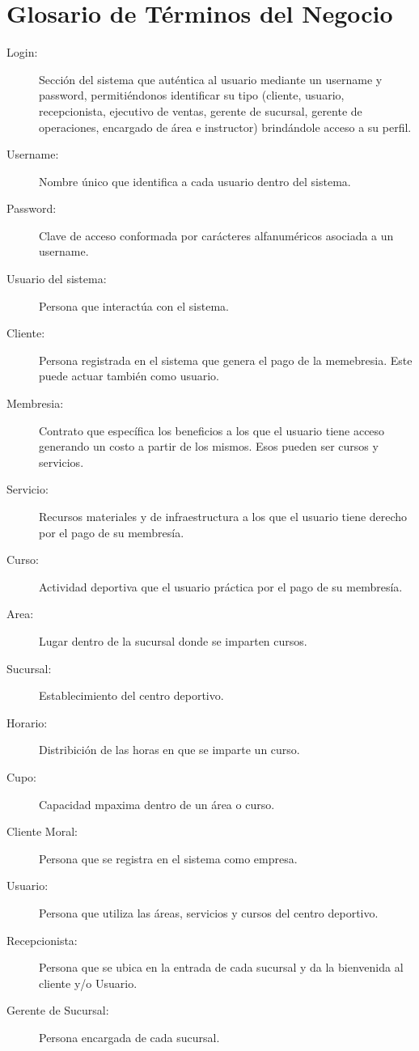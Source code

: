 \section{Glosario de Términos del Negocio}

\begin{description}
	\item[Login:] Sección del sistema que auténtica al usuario mediante un username y password, permitiéndonos identificar su tipo (cliente, usuario, recepcionista, ejecutivo de ventas, gerente de sucursal, gerente de operaciones, encargado de área e instructor) brindándole acceso a su perfil.
	\item[Username:] Nombre único que identifica a cada usuario dentro del sistema.
	\item[Password:] Clave de acceso conformada por carácteres alfanuméricos asociada a un username.
	\item[Usuario del sistema:] Persona que interactúa con el sistema.  
	\item[Cliente:] Persona registrada en el sistema que genera el pago de la memebresia. Este puede actuar también como usuario.
	\item[Membresia:] Contrato que específica los beneficios a los que el usuario tiene acceso generando un costo a partir de los mismos. Esos pueden ser cursos y servicios.
	\item[Servicio:] Recursos materiales y de infraestructura a los que el usuario tiene derecho por el pago de su membresía.
	\item[Curso:] Actividad deportiva que el usuario práctica por el pago de su membresía.
	\item[Area:] Lugar dentro de la sucursal donde se imparten cursos.
	\item[Sucursal:] Establecimiento del centro deportivo.
	\item[Horario:] Distribición de las horas en que se imparte un curso.
	\item[Cupo: ] Capacidad mpaxima dentro de un área o curso.
	\item[Cliente Moral:] Persona que se registra en el sistema como empresa.
	\item[Usuario:] Persona que utiliza las áreas, servicios y cursos del centro deportivo.
	\item[Recepcionista:] Persona que se ubica en la entrada de cada sucursal y da la bienvenida al cliente y/o Usuario.
	\item[Gerente de Sucursal:] Persona encargada de cada sucursal.

\end{description}
